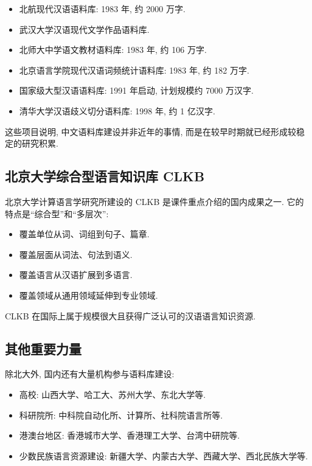 \begin{itemize}
\item 北航现代汉语语料库: 1983 年, 约 2000 万字.
\item 武汉大学汉语现代文学作品语料库.
\item 北师大中学语文教材语料库: 1983 年, 约 106 万字.
\item 北京语言学院现代汉语词频统计语料库: 1983 年, 约 182 万字.
\item 国家级大型汉语语料库: 1991 年启动, 计划规模约 7000 万汉字.
\item 清华大学汉语歧义切分语料库: 1998 年, 约 1 亿汉字.
\end{itemize}

这些项目说明, 中文语料库建设并非近年的事情, 而是在较早时期就已经形成较稳定的研究积累.

\subsection{北京大学综合型语言知识库 CLKB}


北京大学计算语言学研究所建设的 CLKB 是课件重点介绍的国内成果之一.
它的特点是“综合型”和“多层次”:

\begin{itemize}
\item 覆盖单位从词、词组到句子、篇章.
\item 覆盖层面从词法、句法到语义.
\item 覆盖语言从汉语扩展到多语言.
\item 覆盖领域从通用领域延伸到专业领域.
\end{itemize}

CLKB 在国际上属于规模很大且获得广泛认可的汉语语言知识资源.

\subsection{其他重要力量}


除北大外, 国内还有大量机构参与语料库建设:

\begin{itemize}
\item 高校: 山西大学、哈工大、苏州大学、东北大学等.
\item 科研院所: 中科院自动化所、计算所、社科院语言所等.
\item 港澳台地区: 香港城市大学、香港理工大学、台湾中研院等.
\item 少数民族语言资源建设: 新疆大学、内蒙古大学、西藏大学、西北民族大学等.
\end{itemize}


